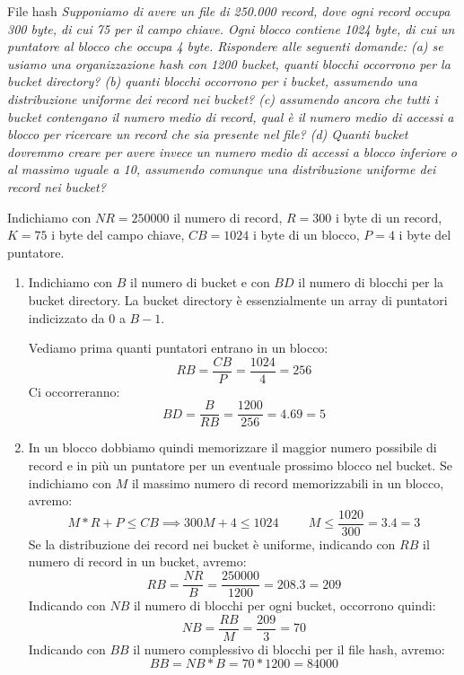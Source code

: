 \begin{Example}{File hash}{}
    \textit{Supponiamo di avere un file di 250.000 record, dove ogni record occupa 300 byte, di cui 75 per il campo chiave. Ogni blocco contiene 1024 byte, di cui un puntatore al blocco che occupa 4 byte. Rispondere alle seguenti domande: (a) se usiamo una organizzazione hash con 1200 bucket, quanti blocchi occorrono per la bucket directory? (b) quanti blocchi occorrono per i bucket, assumendo una distribuzione uniforme dei record nei bucket? (c) assumendo ancora che tutti i bucket contengano il numero medio di record, qual è il numero medio di accessi a blocco per ricercare un record che sia presente nel file? (d) Quanti bucket dovremmo creare per avere invece un numero medio di accessi a blocco inferiore o al massimo uguale a 10, assumendo comunque una distribuzione uniforme dei record nei bucket?}

    Indichiamo con $NR=250000$ il numero di record, $R=300$ i byte di un record, $K=75$ i byte del campo chiave, $CB=1024$ i byte di un blocco, $P=4$ i byte del puntatore.
    \begin{enumerate}[label=(\alph*)]
        \item Indichiamo con $B$ il numero di bucket e con $BD$ il numero di blocchi per la bucket directory. La bucket directory è essenzialmente un array di puntatori indicizzato da 0 a $B-1$.

        Vediamo prima quanti puntatori entrano in un blocco:
        \begin{equation*}
            RB=\frac{CB}{P}=\frac{1024}{4}=256
        \end{equation*}
        Ci occorreranno:
        \begin{equation*}
            BD=\frac{B}{RB}=\frac{1200}{256}=4.69=5
        \end{equation*}

        \item In un blocco dobbiamo quindi memorizzare il maggior numero possibile di record e in più un puntatore per un eventuale prossimo blocco nel bucket. Se indichiamo con $M$ il massimo numero di record memorizzabili in un blocco, avremo:
        \begin{equation*}
            M*R+P\leq CB\implies 300M+4\leq 1024\hspace{1cm}M\leq \frac{1020}{300}=3.4=3
        \end{equation*}
        Se la distribuzione dei record nei bucket è uniforme, indicando con $RB$ il numero di record in un bucket, avremo:
        \begin{equation*}
            RB=\frac{NR}{B}=\frac{250000}{1200}=208.3=209
        \end{equation*}
        Indicando con $NB$ il numero di blocchi per ogni bucket, occorrono quindi:
        \begin{equation*}
            NB=\frac{RB}{M}=\frac{209}{3}=70
        \end{equation*}
        Indicando con $BB$ il numero complessivo di blocchi per il file hash, avremo:
        \begin{equation*}
            BB=NB*B=70*1200=84000
        \end{equation*}


\end{enumerate}
\end{Example}
